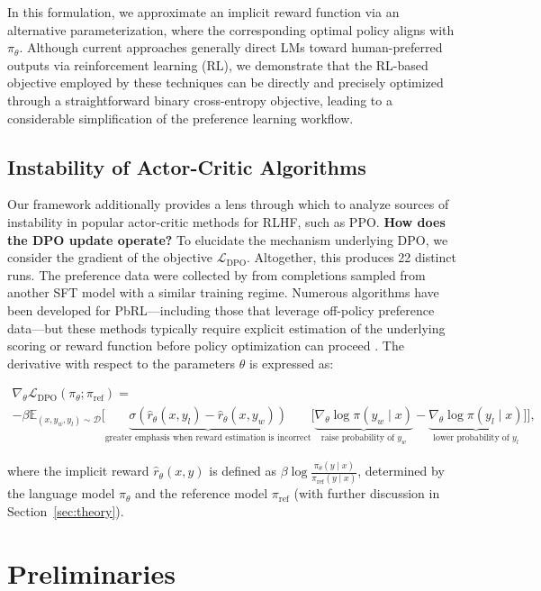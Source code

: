 \begin{lemma}
In this formulation, we approximate an implicit reward function via an alternative parameterization, where the corresponding optimal policy aligns with $\pi_\theta$. Although current approaches generally direct LMs toward human-preferred outputs via reinforcement learning (RL), we demonstrate that the RL-based objective employed by these techniques can be directly and precisely optimized through a straightforward binary cross-entropy objective, leading to a considerable simplification of the preference learning workflow. \subsection{Instability of Actor-Critic Algorithms} Our framework additionally provides a lens through which to analyze sources of instability in popular actor-critic methods for RLHF, such as PPO. \textbf{How does the DPO update operate?} To elucidate the mechanism underlying DPO, we consider the gradient of the objective $\mathcal{L}_\text{DPO}$. Altogether, this produces 22 distinct runs. The preference data were collected by \citeauthor{stiennon2022learning} from completions sampled from another SFT model with a similar training regime. Numerous algorithms have been developed for PbRL—including those that leverage off-policy preference data—but these methods typically require explicit estimation of the underlying scoring or reward function before policy optimization can proceed \citep{jain2013learning,BusaFekete2014,christiano2017deep,sadigh2017active,kupcsik2018learning}. The derivative with respect to the parameters $\theta$ is expressed as:

\begin{multline*}\label{eq:gradient}
    \nabla_\theta \mathcal{L}_\text{DPO}(\pi_\theta;\pi_\text{ref}) = \\ -\beta\mathbb{E}_{(x, y_w, y_l) \sim \mathcal{D}} \Bigg[\underbrace{\sigma(\hat{r}_\theta(x, y_l) - \hat{r}_\theta (x, y_w))}_\text{greater emphasis when reward estimation is incorrect}\Big[\underbrace{\nabla_\theta\log \pi(y_w \mid x)}_\text{raise probability of $y_w$} - \underbrace{\nabla_\theta\log\pi(y_l \mid x)}_\text{lower probability of $y_l$}\Big]\Bigg],
\end{multline*}

where the implicit reward $\hat{r}_\theta(x, y)$ is defined as $\beta \log \frac{\pi_\theta(y \mid x)}{\pi_\text{ref}(y \mid x)}$, determined by the language model $\pi_\theta$ and the reference model $\pi_\text{ref}$ (with further discussion in Section~\ref{sec:theory}). \section{Preliminaries}\label{section:prelims}


\end{lemma}
